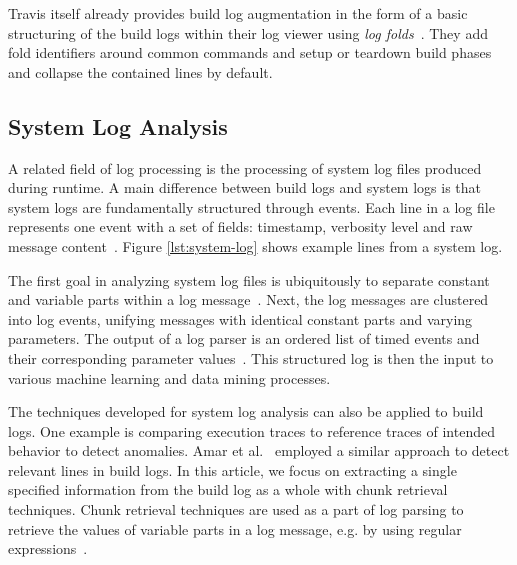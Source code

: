Travis itself already provides build log augmentation in the form of a
basic structuring of the build logs within their log viewer using
\emph{log folds}~\cite{travis2019logfolds}. They add fold identifiers
around common commands and setup or teardown build phases and collapse
the contained lines by default.

\subsection{System Log Analysis}
\label{sec:log-analysis}
A related field of log processing is the processing of system log
files produced during runtime. A main difference between build logs
and system logs is that system logs are fundamentally structured
through events. Each line in a log file represents one event with a
set of fields: timestamp, verbosity level and raw message
content~\cite{he2017towards}. Figure \ref{lst:system-log} shows
example lines from a system log.

The first goal in analyzing system log files is ubiquitously to
separate constant and variable parts within a log
message~\cite{nagappan2010abstracting,he2017towards}. Next, the log
messages are clustered into log events, unifying messages with
identical constant parts and varying parameters. The output of a log
parser is an ordered list of timed events and their corresponding
parameter values~\cite{he2016evaluation}. This structured log is then
the input to various machine learning and data mining processes.

The techniques developed for system log analysis can also be applied
to build logs. One example is comparing execution traces to reference
traces of intended behavior to detect anomalies. Amar et
al.~\cite{amar2019mining} employed a similar approach to detect
relevant lines in build logs.
In this article, we focus on extracting a single specified information
from the build log as a whole with chunk retrieval techniques. Chunk
retrieval techniques are used as a part of log parsing to retrieve the
values of variable parts in a log message, e.g. by using regular
expressions~\cite{nagappan2010abstracting,xu2009detecting}.

